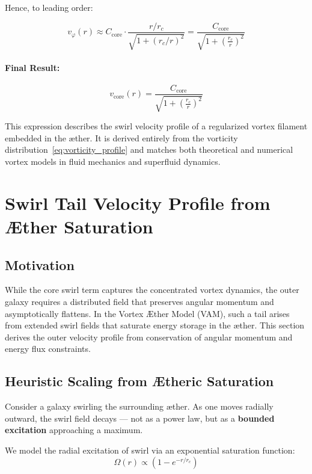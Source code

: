 \documentclass[12pt]{article}
\begin{document}
Hence, to leading order:

\[
v_\varphi(r) \approx C_{\text{core}} \cdot \frac{r/r_c}{\sqrt{1 + (r_c/r)^2}}
= \frac{C_{\text{core}}}{\sqrt{1 + \left(\frac{r_c}{r}\right)^2}}
\]

\paragraph{Final Result:}

\begin{equation}
    \boxed{
        v_\text{core}(r) = \frac{C_{\text{core}}}{\sqrt{1 + \left( \frac{r_c}{r} \right)^2 }}
    }
    \label{eq:core_velocity_final}
\end{equation}

This expression describes the swirl velocity profile of a regularized vortex filament embedded in the æther. It is derived entirely from the vorticity distribution~\eqref{eq:vorticity_profile} and matches both theoretical and numerical vortex models in fluid mechanics and superfluid dynamics.

\section{Swirl Tail Velocity Profile from Æther Saturation}
\label{appendix:swirl-tail}

\subsection{Motivation}

While the core swirl term captures the concentrated vortex dynamics, the outer galaxy requires a distributed field that preserves angular momentum and asymptotically flattens. In the Vortex \AE{}ther Model (VAM), such a tail arises from extended swirl fields that saturate energy storage in the æther. This section derives the outer velocity profile from conservation of angular momentum and energy flux constraints.

\subsection{Heuristic Scaling from Ætheric Saturation}

Consider a galaxy swirling the surrounding æther. As one moves radially outward, the swirl field decays — not as a power law, but as a \textbf{bounded excitation} approaching a maximum.

We model the radial excitation of swirl via an exponential saturation function:
\[
\Omega(r) \propto \left(1 - e^{-r/r_c} \right)
\]
\end{document}

